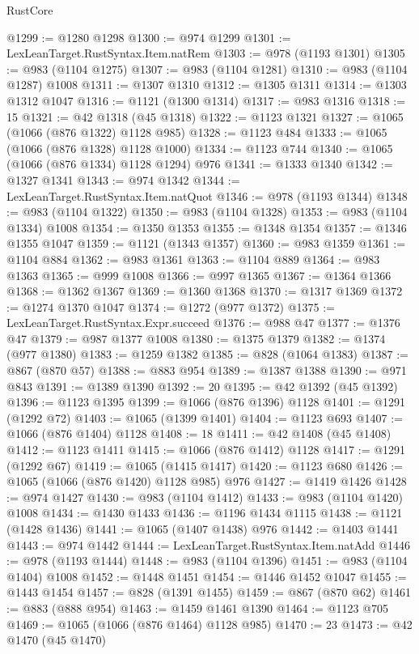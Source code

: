 \begin{lexlean}{RustCore}
\begin{coremodule}
@1299 := @1280 @1298
@1300 := @974 @1299
@1301 := LexLeanTarget.RustSyntax.Item.natRem
@1303 := @978 (@1193 @1301)
@1305 := @983 (@1104 @1275)
@1307 := @983 (@1104 @1281)
@1310 := @983 (@1104 @1287) @1008
@1311 := @1307 @1310
@1312 := @1305 @1311
@1314 := @1303 @1312 @1047
@1316 := @1121 (@1300 @1314)
@1317 := @983 @1316
@1318 := 15
@1321 := @42 @1318 (@45 @1318)
@1322 := @1123 @1321
@1327 := @1065 (@1066 (@876 @1322) @1128 @985)
@1328 := @1123 @484
@1333 := @1065 (@1066 (@876 @1328) @1128 @1000)
@1334 := @1123 @744
@1340 := @1065 (@1066 (@876 @1334) @1128 @1294) @976
@1341 := @1333 @1340
@1342 := @1327 @1341
@1343 := @974 @1342
@1344 := LexLeanTarget.RustSyntax.Item.natQuot
@1346 := @978 (@1193 @1344)
@1348 := @983 (@1104 @1322)
@1350 := @983 (@1104 @1328)
@1353 := @983 (@1104 @1334) @1008
@1354 := @1350 @1353
@1355 := @1348 @1354
@1357 := @1346 @1355 @1047
@1359 := @1121 (@1343 @1357)
@1360 := @983 @1359
@1361 := @1104 @884
@1362 := @983 @1361
@1363 := @1104 @889
@1364 := @983 @1363
@1365 := @999 @1008
@1366 := @997 @1365
@1367 := @1364 @1366
@1368 := @1362 @1367
@1369 := @1360 @1368
@1370 := @1317 @1369
@1372 := @1274 @1370 @1047
@1374 := @1272 (@977 @1372)
@1375 := LexLeanTarget.RustSyntax.Expr.succeed
@1376 := @988 @47
@1377 := @1376 @47
@1379 := @987 @1377 @1008
@1380 := @1375 @1379
@1382 := @1374 (@977 @1380)
@1383 := @1259 @1382
@1385 := @828 (@1064 @1383)
@1387 := @867 (@870 @57)
@1388 := @883 @954
@1389 := @1387 @1388
@1390 := @971 @843
@1391 := @1389 @1390
@1392 := 20
@1395 := @42 @1392 (@45 @1392)
@1396 := @1123 @1395
@1399 := @1066 (@876 @1396) @1128
@1401 := @1291 (@1292 @72)
@1403 := @1065 (@1399 @1401)
@1404 := @1123 @693
@1407 := @1066 (@876 @1404) @1128
@1408 := 18
@1411 := @42 @1408 (@45 @1408)
@1412 := @1123 @1411
@1415 := @1066 (@876 @1412) @1128
@1417 := @1291 (@1292 @67)
@1419 := @1065 (@1415 @1417)
@1420 := @1123 @680
@1426 := @1065 (@1066 (@876 @1420) @1128 @985) @976
@1427 := @1419 @1426
@1428 := @974 @1427
@1430 := @983 (@1104 @1412)
@1433 := @983 (@1104 @1420) @1008
@1434 := @1430 @1433
@1436 := @1196 @1434 @1115
@1438 := @1121 (@1428 @1436)
@1441 := @1065 (@1407 @1438) @976
@1442 := @1403 @1441
@1443 := @974 @1442
@1444 := LexLeanTarget.RustSyntax.Item.natAdd
@1446 := @978 (@1193 @1444)
@1448 := @983 (@1104 @1396)
@1451 := @983 (@1104 @1404) @1008
@1452 := @1448 @1451
@1454 := @1446 @1452 @1047
@1455 := @1443 @1454
@1457 := @828 (@1391 @1455)
@1459 := @867 (@870 @62)
@1461 := @883 (@888 @954)
@1463 := @1459 @1461 @1390
@1464 := @1123 @705
@1469 := @1065 (@1066 (@876 @1464) @1128 @985)
@1470 := 23
@1473 := @42 @1470 (@45 @1470)

\end{coremodule}
\end{lexlean}
